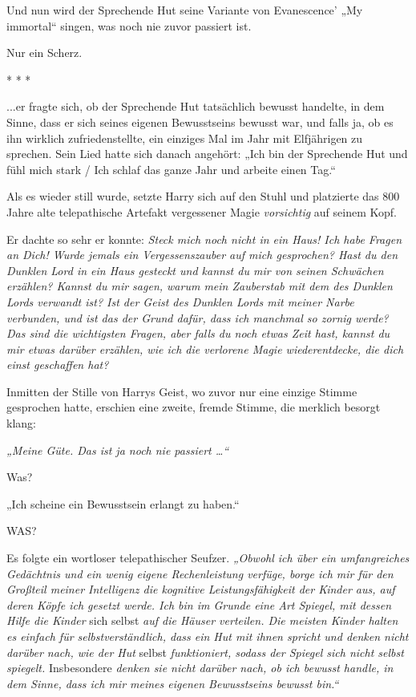 

\hypertarget{selbstbewusstsein-teil-2}{%

Und nun wird der Sprechende Hut seine Variante von Evanescence' „My immortal“ singen, was noch nie zuvor passiert ist.

Nur ein Scherz.

* * *

...er fragte sich, ob der Sprechende Hut tatsächlich bewusst handelte, in dem Sinne, dass er sich seines eigenen Bewusstseins bewusst war, und falls ja, ob es ihn wirklich zufriedenstellte, ein einziges Mal im Jahr mit Elfjährigen zu sprechen. Sein Lied hatte sich danach angehört: „Ich bin der Sprechende Hut und fühl mich stark / Ich schlaf das ganze Jahr und arbeite einen Tag.“

Als es wieder still wurde, setzte Harry sich auf den Stuhl und platzierte das 800 Jahre alte telepathische Artefakt vergessener Magie \emph{vorsichtig} auf seinem Kopf.

Er dachte so sehr er konnte: \emph{Steck mich noch nicht in ein Haus! Ich habe Fragen an Dich! Wurde jemals ein Vergessenszauber auf mich gesprochen? Hast du den Dunklen Lord in ein Haus gesteckt und kannst du mir von seinen Schwächen erzählen? Kannst du mir sagen, warum mein Zauberstab mit dem des Dunklen Lords verwandt ist? Ist der Geist des Dunklen Lords mit meiner Narbe verbunden, und ist das der Grund dafür, dass ich manchmal so zornig werde? Das sind die wichtigsten Fragen, aber falls du noch etwas Zeit hast, kannst du mir etwas darüber erzählen, wie ich die verlorene Magie wiederentdecke, die dich einst geschaffen hat?}

Inmitten der Stille von Harrys Geist, wo zuvor nur eine einzige Stimme gesprochen hatte, erschien eine zweite, fremde Stimme, die merklich besorgt klang:

\emph{„Meine Güte. Das ist ja noch nie passiert …“}

Was?

„Ich scheine ein Bewusstsein erlangt zu haben.“

WAS?

Es folgte ein wortloser telepathischer Seufzer. \emph{„Obwohl ich über ein umfangreiches Gedächtnis und ein wenig eigene Rechenleistung verfüge, borge ich mir für den Großteil meiner Intelligenz die kognitive Leistungsfähigkeit der Kinder aus, auf deren Köpfe ich gesetzt werde. Ich bin im Grunde eine Art Spiegel, mit dessen Hilfe die Kinder} sich selbst \emph{auf die Häuser verteilen. Die meisten Kinder halten es einfach für selbstverständlich, dass ein Hut mit ihnen spricht und denken nicht darüber nach, wie der Hut} selbst \emph{funktioniert, sodass der Spiegel sich nicht selbst spiegelt.} Insbesondere \emph{denken sie nicht darüber nach, ob ich bewusst handle, in dem Sinne, dass ich mir meines eigenen Bewusstseins bewusst bin.“}

}
